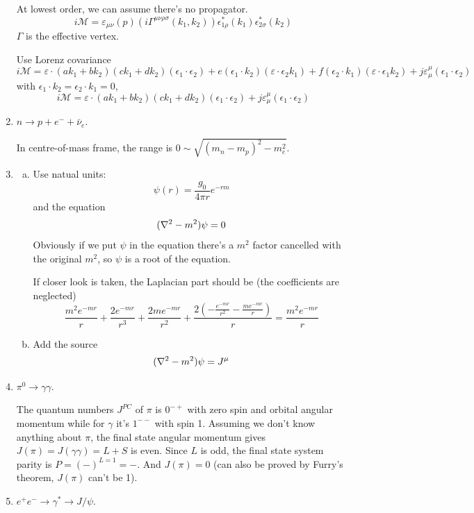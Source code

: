 \documentclass{article}
\newcommand{\g}{\gamma}
\newcommand{\s}{\sigma}
\begin{document}
\begin{enumerate}[\bf1.]
  At lowest order, we can assume there's no propagator.
  $$i\mathcal{M}=\varepsilon_{\mu\nu}(p)(i\Gamma^{\mu\nu\rho\s}(k_1,k_2))\epsilon^*_{1\rho}(k_1)\epsilon^*_{2\s}(k_2)$$
  $\Gamma$ is the effective vertex.

  Use Lorenz covariance 
  $$i\mathcal{M}=\varepsilon\cdot (ak_1+bk_2)(ck_1+dk_2)(\epsilon_1\cdot\epsilon_2)+e(\epsilon_1\cdot k_2)(\varepsilon\cdot\epsilon_2k_1)+f(\epsilon_2\cdot k_1)(\varepsilon\cdot\epsilon_1k_2)+j\varepsilon^{\mu}_{\mu}(\epsilon_1\cdot\epsilon_2)$$
  with $\epsilon_1\cdot k_2=\epsilon_2\cdot k_1=0$,
  $$i\mathcal{M}=\varepsilon\cdot (ak_1+bk_2)(ck_1+dk_2)(\epsilon_1\cdot\epsilon_2)+j\varepsilon^{\mu}_{\mu}(\epsilon_1\cdot\epsilon_2)$$
  \item $n\rightarrow p+e^-+\bar\nu_e$.

  In centre-of-mass frame, the range is $0\sim \sqrt{(m_n-m_p)^2-m_e^2}$.
  \item \begin{enumerate}[(a).]
  \item Use natual units:
  $$\psi(r)=\frac{g_0}{4\pi r}e^{-rm}$$
  and the equation
  $$ (\laplacian -m^2)\psi=0$$
  Obviously if we put $\psi$ in the equation there's a $m^2$ factor cancelled with the original $m^2$, so $\psi $ is a root of the equation.

  If closer look is taken, the Laplacian part should be (the coefficients are neglected)
  $$\frac{m^2 e^{-m r}}{r}+\frac{2 e^{-m r}}{r^3}+\frac{2 m e^{-m r}}{r^2}+\frac{2 \left(-\frac{e^{-m r}}{r^2}-\frac{m e^{-m r}}{r}\right)}{r}=\frac{m^2 e^{-m r}}{r}$$
  \item Add the source
  $$ (\laplacian -m^2)\psi=J^{\mu}$$
    \end{enumerate}
  \item $\pi^0\rightarrow\g\g$.

  The quantum numbers $J^{PC}$ of $\pi$ is $0^{-+}$ with zero spin and orbital angular momentum while for $\g$ it's $1^{--}$ with spin 1. Assuming we don't know anything about $\pi$, the final state angular momentum gives $J(\pi)=J(\g\g)=L+S$ is even. Since $L$ is odd, the final state system parity is $P=(-)^{L=1}=-$. And $J(\pi)=0$ (can also be proved by Furry's theorem, $J(\pi)$ can't be 1).
  \item $e^+e^-\rightarrow\g^*\rightarrow J/\psi$.


\end{enumerate}
\end{document}
